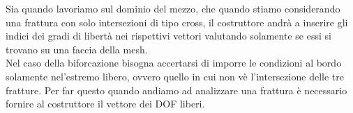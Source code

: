 
Sia quando lavoriamo sul dominio del mezzo, che quando stiamo considerando una frattura con solo intersezioni di tipo cross, il costruttore andrà a inserire gli indici dei gradi di libert\`{a} nei rispettivi vettori valutando solamente se essi si trovano su una faccia della mesh.\\
Nel caso della biforcazione bisogna accertarsi di imporre le condizioni al bordo solamente nel'estremo libero, ovvero quello in cui non v\`{e} l'intersezione delle tre fratture.
%
Per far questo quando andiamo ad analizzare una frattura \`{e} necessario fornire al costruttore il vettore dei DOF liberi.


 

				
%		
%

